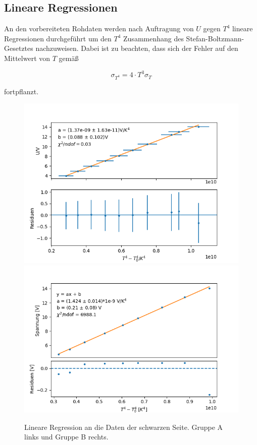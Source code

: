 \documentclass[12pt,a4paper]{article}
\begin{document}
\subsection{Lineare Regressionen}
An den vorbereiteten Rohdaten werden nach Auftragung von $U$ gegen $T^4$ lineare Regressionen durchgeführt um den $T^4$ Zusammenhang des Stefan-Boltzmann-Gesetztes nachzuweisen. Dabei ist zu beachten, dass sich der Fehler auf den Mittelwert von $T$ gemäß 

\begin{equation}
\sigma_{T^4} = 4 \cdot T^3 \sigma_T
\end{equation}

fortpflanzt.

\begin{figure}[H]
\centering
\includegraphics[scale=0.5]{Bilder/Schwarz_A}
\includegraphics[scale=0.5]{Bilder/schwarz_B}
\caption{Lineare Regression an die Daten der schwarzen Seite. Gruppe A links und Gruppe B rechts.}
\label{fig:RegSchwarz}
\end{figure}
\end{document}

